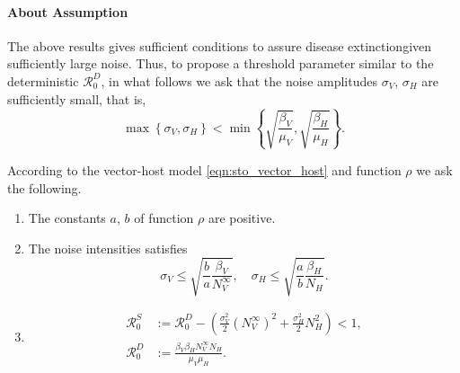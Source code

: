 \paragraph{About Assumption}
The above results gives sufficient conditions to assure 
disease extinction\textemdash given sufficiently large noise. Thus, 
to propose a threshold parameter similar  to the deterministic
$\mathcal{R}_0^D$, in what follows we ask that the noise amplitudes 
$\sigma_V$, $\sigma_H$ are sufficiently small, that is,
\begin{equation}\label{eqn:noise_small_condition}
    \displaystyle
    \max
        \left \{
              \sigma_V, \sigma_H 
        \right\} 
        < 
    \min 
        \left \{
            \sqrt{\frac{\beta_V}{\mu_V}},
            \sqrt{\frac{\beta_H}{\mu_H}}
        \right \}.
\end{equation}
%
%
%
\begin{assumption}\label{ass:extinction}
    According to the vector-host model \eqref{eqn:sto_vector_host} and 
    function
    $\rho$
    we ask the following.
    \begin{enumerate}[\bf{(E\textendash}1)]
        \item 
            The constants $a$, $b$ of function $\rho$ are positive.
        \item \label{ass:noise_condition}
            The noise intensities satisfies
            $$
                \sigma_V \leq 
                    \sqrt{
                        \frac{b}{a}
                        \frac{\beta_V}{N_V^{\infty}}
                        },
                 \quad
                \sigma_H \leq
                    \sqrt{
                        \frac{a}{b}
                        \frac{\beta_H }{N_H
                    }}.
            $$
        \item
            \begin{equation*}
                \begin{aligned}
                    \mathcal{R}_0 ^ S &:=
                        \mathcal{R}_0^D - 
                        \left( 
                            \frac{\sigma_V ^ 2}{2} (N_V ^ {\infty}) ^ 2
                            +
                            \frac{\sigma_H ^ 2}{2} N_H ^ 2
                        \right)
                        <1,
                        \\
                    \mathcal{R}_0 ^ D &:=
                            \frac{
                                \beta_V \beta_H N_V ^ \infty N_H}{\mu_V \mu_H} .
                \end{aligned}
            \end{equation*}
    \end{enumerate}
\end{assumption}        
